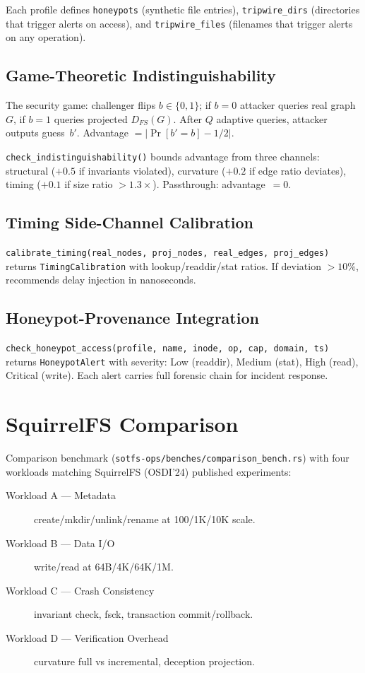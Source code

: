 \documentclass[11pt,a4paper,twoside]{report}
\theoremstyle{definition}
\begin{document}
Each profile defines \texttt{honeypots} (synthetic file entries), \texttt{tripwire\_dirs}
(directories that trigger alerts on access), and \texttt{tripwire\_files} (filenames that
trigger alerts on any operation).

\section{Game-Theoretic Indistinguishability}

The security game: challenger flips $b \in \{0,1\}$; if $b=0$ attacker queries real
graph $G$, if $b=1$ queries projected $D_{FS}(G)$. After $Q$ adaptive queries, attacker
outputs guess~$b'$. Advantage $= |\Pr[b'=b] - 1/2|$.

\texttt{check\_indistinguishability()} bounds advantage from three channels:
structural ($+0.5$ if invariants violated), curvature ($+0.2$ if edge ratio
deviates), timing ($+0.1$ if size ratio $> 1.3\times$). Passthrough: advantage~$=0$.

\section{Timing Side-Channel Calibration}

\texttt{calibrate\_timing(real\_nodes, proj\_nodes, real\_edges, proj\_edges)} returns
\texttt{TimingCalibration} with lookup/readdir/stat ratios. If deviation $>10\%$,
recommends delay injection in nanoseconds.

\section{Honeypot-Provenance Integration}

\texttt{check\_honeypot\_access(profile, name, inode, op, cap, domain, ts)} returns
\texttt{HoneypotAlert} with severity: Low (readdir), Medium (stat), High (read),
Critical (write). Each alert carries full forensic chain for incident response.

\chapter{SquirrelFS Comparison}

Comparison benchmark (\texttt{sotfs-ops/benches/comparison\_bench.rs}) with four workloads
matching SquirrelFS (OSDI'24) published experiments:

\begin{description}
\item[Workload A --- Metadata] create/mkdir/unlink/rename at 100/1K/10K scale.
\item[Workload B --- Data I/O] write/read at 64B/4K/64K/1M.
\item[Workload C --- Crash Consistency] invariant check, fsck, transaction commit/rollback.
\item[Workload D --- Verification Overhead] curvature full vs incremental, deception projection.
\end{description}
\end{document}
